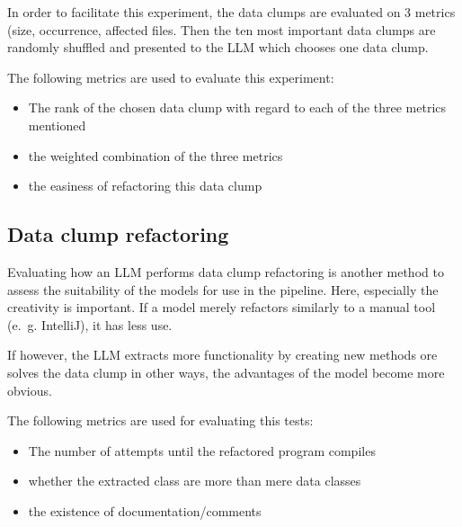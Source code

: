 In order to facilitate this experiment, the data clumps are evaluated on 3 metrics (size, occurrence, affected files. Then the ten most important data clumps are randomly shuffled and presented to the \ac{LLM} which chooses one data clump. 

The following metrics are used to evaluate this experiment:
\begin{itemize}
    \item The rank of the chosen data clump with regard to each of the three metrics mentioned
    \item the weighted combination of the three metrics
    \item the easiness of refactoring this data clump
\end{itemize}


\subsection{Data clump refactoring}

Evaluating how an \ac{LLM} performs data clump refactoring is another method to assess the suitability of the models for use in the pipeline. Here, especially the creativity is important. If a model merely refactors similarly to a manual tool (e.~g. IntelliJ), it has less use.

If however, the \ac{LLM} extracts more functionality by creating new methods ore solves the data clump in other ways, the advantages of the model become more obvious.


The following metrics are used for evaluating this tests:

\begin{itemize}
    \item The number of attempts until the refactored program compiles
    \item whether the extracted class are more than mere data classes
    \item the existence of documentation/comments
\end{itemize}

